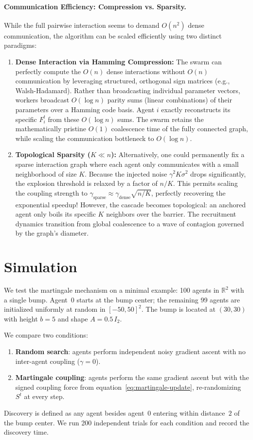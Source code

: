 \documentclass{article}
\begin{document}
\paragraph{Communication Efficiency: Compression vs. Sparsity.}
While the full pairwise interaction seems to demand $O(n^2)$ dense communication, the algorithm can be scaled efficiently using two distinct paradigms:
\begin{enumerate}
    \item \textbf{Dense Interaction via Hamming Compression:} The swarm can perfectly compute the $O(n)$ dense interactions without $O(n)$ communication by leveraging structured, orthogonal sign matrices (e.g., Walsh-Hadamard). Rather than broadcasting individual parameter vectors, workers broadcast $O(\log n)$ parity sums (linear combinations) of their parameters over a Hamming code basis. Agent $i$ exactly reconstructs its specific $F_i^t$ from these $O(\log n)$ sums. The swarm retains the mathematically pristine $O(1)$ coalescence time of the fully connected graph, while scaling the communication bottleneck to $O(\log n)$.
    \item \textbf{Topological Sparsity ($K \ll n$):} Alternatively, one could permanently fix a sparse interaction graph where each agent only communicates with a small neighborhood of size $K$. Because the injected noise $\gamma^2 K \sigma^2$ drops significantly, the explosion threshold is relaxed by a factor of $n/K$. This permits scaling the coupling strength to $\gamma_{\text{sparse}} \approx \gamma_{\text{dense}} \sqrt{n/K}$, perfectly recovering the exponential speedup! However, the cascade becomes topological: an anchored agent only boils its specific $K$ neighbors over the barrier. The recruitment dynamics transition from global coalescence to a wave of contagion governed by the graph's diameter.
\end{enumerate}

\section{Simulation}

We test the martingale mechanism on a minimal example: 100 agents in
$\mathbb{R}^2$ with a single bump. Agent~0 starts at the bump center;
the remaining 99 agents are initialized uniformly at random in
$[-50, 50]^2$. The bump is located at $(30, 30)$ with height $b = 5$
and shape $A = 0.5\,I_2$.

We compare two conditions:
\begin{enumerate}
  \item \textbf{Random search}: agents perform independent noisy gradient
    ascent with no inter-agent coupling ($\gamma = 0$).
  \item \textbf{Martingale coupling}: agents perform the same gradient
    ascent but with the signed coupling force from
    equation~\eqref{eq:martingale-update}, re-randomizing $S^t$ at every step.
\end{enumerate}
Discovery is defined as any agent besides agent~0 entering within
distance~$2$ of the bump center. We run 200 independent trials for each
condition and record the discovery time.
\end{document}
